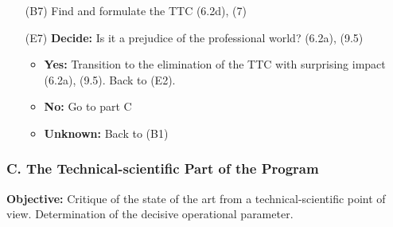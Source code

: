 \documentclass[12pt,a4paper]{article}
\begin{document}
\begin{itemize}[leftmargin=35pt,align=left]
\begin{itemize}[leftmargin=20pt]
    (SSS) is found (6.5). Back to (E2).
  \item \textbf{No:} Go to (B7)
  \end{itemize}
\item[(B7)] Find and formulate the TTC (6.2d), (7)
\item[(E7)] \textbf{Decide:} Is it a prejudice of the professional world?
  (6.2a), (9.5)
  \begin{itemize}[leftmargin=20pt]
  \item \textbf{Yes:} Transition to the elimination of the TTC with surprising
    impact (6.2a), (9.5). Back to (E2).
  \item \textbf{No:} Go to part C
  \item \textbf{Unknown:} Back to (B1)
  \end{itemize}
\end{itemize}
\newpage
\subsubsection*{C. The Technical-scientific Part of the Program}
        
\textbf{Objective:} Critique of the state of the art from a
technical-scientific point of view. Determination of the decisive operational
parameter.
\end{document}
